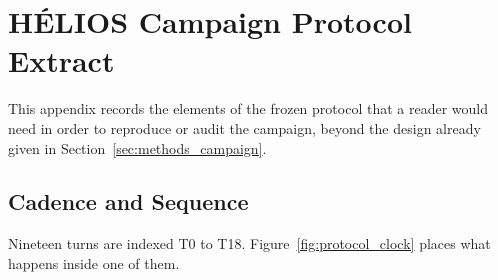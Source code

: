 \section{H\'ELIOS Campaign Protocol Extract}
\label{app:protocol}

This appendix records the elements of the frozen protocol that a reader would need in order
to reproduce or audit the campaign, beyond the design already given in
Section~\ref{sec:methods_campaign}.

\subsection*{Cadence and Sequence}

Nineteen turns are indexed T0 to T18.
Figure~\ref{fig:protocol_clock} places what happens inside one of them.

